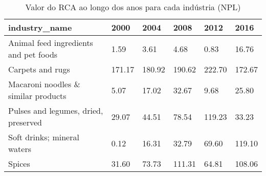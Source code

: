 \begin{table}
\centering
\caption{Valor do RCA ao longo dos anos para cada indústria (NPL)}
\begin{tabular}{p{6cm}p{1.5cm}p{1.5cm}p{1.5cm}p{1.5cm}p{1.5cm}}
\toprule
                        industry\_name &   2000 &   2004 &   2008 &   2012 &   2016 \\
\midrule
Animal feed ingredients and pet foods &   1.59 &   3.61 &   4.68 &   0.83 &  16.76 \\
                     Carpets and rugs & 171.17 & 180.92 & 190.62 & 222.70 & 172.67 \\
  Macaroni noodles \& similar products &   5.07 &  17.02 &  32.67 &   9.68 &  25.80 \\
 Pulses and legumes, dried, preserved &  29.07 &  44.51 &  78.54 & 119.23 &  33.23 \\
          Soft drinks; mineral waters &   0.12 &  16.31 &  32.79 &  69.60 & 119.10 \\
                               Spices &  31.60 &  73.73 & 111.31 &  64.81 & 108.06 \\
\bottomrule
\end{tabular}
\end{table}
